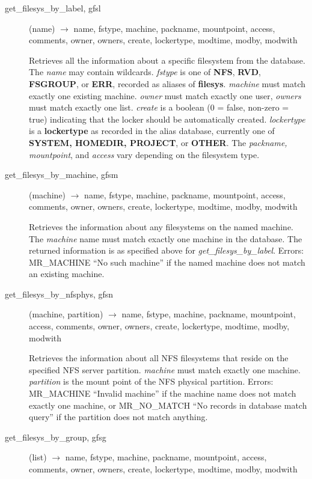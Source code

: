 \begin{description}

\item[ get\_filesys\_by\_label, gfsl](name) $\rightarrow$ name, fstype,
machine, packname, mountpoint, access, comments, owner, owners,
create, lockertype, modtime, modby, modwith

Retrieves all the information about a specific filesystem from the
database.  The {\em name} may contain wildcards.  {\em fstype} is one of
{\bf NFS}, {\bf RVD}, {\bf FSGROUP}, or {\bf ERR}, recorded as aliases of
{\bf filesys}.  {\em machine} must match exactly one existing machine.
{\em owner} must match exactly one user, {\em owners} must match exactly
one list.  {\em create} is a boolean (0 = false, non-zero = true)
indicating that the locker should be automatically created.
{\em lockertype} is a {\bf lockertype} as recorded in the alias database,
currently one of {\bf SYSTEM, HOMEDIR, PROJECT}, or {\bf OTHER}.  The
{\em packname, mountpoint}, and {\em access} vary depending on the
filesystem type.

\item[get\_filesys\_by\_machine, gfsm](machine) $\rightarrow$ name, fstype,
machine, packname, mountpoint, access, comments, owner, owners,
create, lockertype, modtime, modby, modwith

Retrieves the information about any filesystems on the named machine.
The {\em machine} name must match exactly one machine in the database.
The returned information is as specified above for
{\em get\_filesys\_by\_label}.  Errors: MR\_MACHINE ``No such machine'' if
the named machine does not match an existing machine.

\item[get\_filesys\_by\_nfsphys, gfsn](machine, partition)
$\rightarrow$ name, fstype, machine, packname, mountpoint, access, comments,
owner, owners, create, lockertype, modtime, modby, modwith

Retrieves the information about all NFS filesystems that reside on the
specified NFS server partition.  {\em machine} must match exactly one
machine.  {\em partition} is the mount point of the NFS physical
partition.  Errors: MR\_MACHINE ``Invalid machine'' if the machine name
does not match exactly one machine, or MR\_NO\_MATCH ``No records in
database match query'' if the partition does not match anything.

\item[get\_filesys\_by\_group, gfsg](list) $\rightarrow$ name, fstype,
machine, packname, mountpoint, access, comments, owner, owners,
create, lockertype, modtime, modby, modwith


\end{description}
